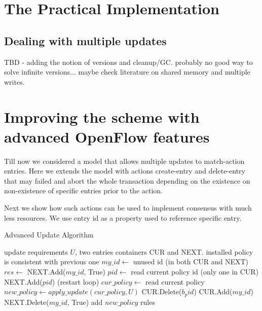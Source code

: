 \documentclass[conference]{sigcomm-alternate}
\begin{document}
\section{The Practical Implementation}\label{sec:extension}

\subsection{Dealing with multiple updates}

TBD - adding the notion of versions and cleanup/GC. probably no good way to solve infinite versions... maybe check literature on shared memory and multiple writes.


\section{Improving the scheme with advanced OpenFlow features}\label{sec:todo}
Till now we considered a model that allows multiple updates to match-action entries. Here we extends the model with actions create-entry and delete-entry that may failed and abort the whole transaction depending on the existence on non-existence of specific entries prior to the action.

Next we show how such actions can be used to implement consensus with much less resources. We use entry id as a property used to reference specific entry.

\begin{algorithm}[t]
    \caption{Advanced Update Algorithm}
    \label{alg:template}
    \begin{algorithmic}[1]
    \Require update requirements $U$, two entries containers CUR and NEXT.
    \Ensure installed policy is consistent with previous one
    \Repeat
			\State $my\_id\gets$ unused id (in both CUR and NEXT)
    		\State $res \gets $ NEXT.Add($my\_id$, True)
 		\Repeat
 			\State $pid\gets$ read current policy id (only one in CUR)
 			\State NEXT.Add($pid$)
 				 (restart loop)
 			\EndIf
 			\State $cur\_policy\gets$ read current policy
 			\State $new\_policy\gets apply\_update(cur\_policy,U)$
 			\startTransaction
	 			\State CUR.Delete($b_pid$)
	 			\State CUR.Add($my\_id$)
				\State NEXT.Delete($my\_id$, True)
	 			\State add $new\_policy$ rules %
 			\endTransaction
			\Return 

    \end{algorithmic}
\end{algorithm}
\end{document}
